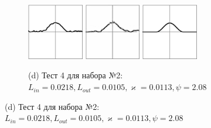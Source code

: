 \documentclass{beamer}
\renewcommand{\kappa}{\varkappa}
\begin{document}
\begin{frame}
\begin{figure}[!hp]
\begin{subfigure}{\textwidth}
		\end{subfigure}
			\vspace{-1em}
		\begin{subfigure}{\textwidth}
			\centering
			\includegraphics[width=0.27\textwidth]{res_n1_7}
			\hfill
			\includegraphics[width=0.27\textwidth]{res_n2_8}
			\hfill
			\includegraphics[width=0.27\textwidth]{4}
			\caption*{\small (d) Тест 4 для набора №2: $L_{in} = 0.0218, L_{out} = 0.0105, \kappa = 0.0113, \psi = 2.08$}
		\end{subfigure}
	\end{figure}
\end{frame}
\end{document}
